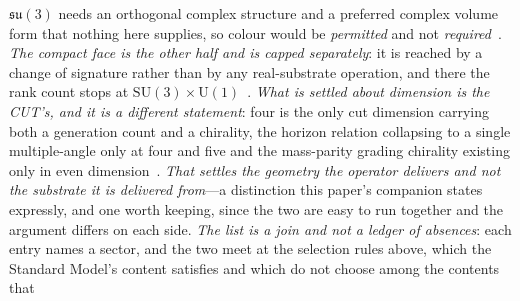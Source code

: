 \documentclass[11pt,a4paper]{article}
\theoremstyle{plain}
\theoremstyle{definition}
\theoremstyle{remark}
\begin{document}
\begin{enumerate}
$\mathfrak{su}(3)$ needs an orthogonal complex structure and a preferred complex volume form that
nothing here supplies, so colour would be \emph{permitted} and not \emph{required}~\cite{JanzenBoundary}.  \emph{The compact face is the other half and is capped
separately}: it is reached by a change of signature rather than by any real-substrate operation, and
there the rank count stops at $\mathrm{SU}(3)\times\mathrm{U}(1)$~\cite{JanzenBoundary}.  \emph{What
is settled about dimension is the CUT's, and it is a different statement}: four is the only cut
dimension carrying both a generation count and a chirality, the horizon relation collapsing to a
single multiple-angle only at four and five and the mass-parity grading chirality existing only in
even dimension~\cite{JanzenGeometricCore,JanzenMatter}.  \emph{That settles the geometry the operator
delivers and not the substrate it is delivered from}---a distinction this paper's companion states
expressly, and one worth keeping, since the two are easy to run together and the argument differs on
each side.  \emph{The list is a join
and not a ledger of absences}: each entry names a sector, and the two meet at the selection rules
above, which the Standard Model's content satisfies and which do not choose among the contents that

\end{enumerate}
\end{document}
